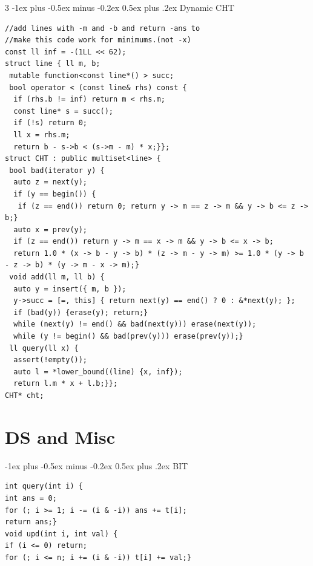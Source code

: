 \documentclass[8pt,a4paper,onesided]{article}
\makeatletter
\renewcommand{\subsection}{\@startsection{subsection}{2}{0mm}
    {-1ex plus -0.5ex minus -0.2ex} %
    {0.5ex plus .2ex}                %
    {\normalfont\large\bfseries}}    %
\makeatother
\begin{document}
\begin{multicols}{3}
\subsection{Dynamic CHT}
\begin{verbatim}
//add lines with -m and -b and return -ans to
//make this code work for minimums.(not -x)
const ll inf = -(1LL << 62);
struct line { ll m, b;
 mutable function<const line*() > succ;
 bool operator < (const line& rhs) const {
  if (rhs.b != inf) return m < rhs.m;
  const line* s = succ();
  if (!s) return 0;
  ll x = rhs.m;
  return b - s->b < (s->m - m) * x;}};
struct CHT : public multiset<line> {
 bool bad(iterator y) {
  auto z = next(y);
  if (y == begin()) {
   if (z == end()) return 0; return y -> m == z -> m && y -> b <= z -> b;}
  auto x = prev(y);
  if (z == end()) return y -> m == x -> m && y -> b <= x -> b;
  return 1.0 * (x -> b - y -> b) * (z -> m - y -> m) >= 1.0 * (y -> b - z -> b) * (y -> m - x -> m);}
 void add(ll m, ll b) {
  auto y = insert({ m, b });
  y->succ = [=, this] { return next(y) == end() ? 0 : &*next(y); };
  if (bad(y)) {erase(y); return;}
  while (next(y) != end() && bad(next(y))) erase(next(y));
  while (y != begin() && bad(prev(y))) erase(prev(y));}
 ll query(ll x) {
  assert(!empty());
  auto l = *lower_bound((line) {x, inf});
  return l.m * x + l.b;}};
CHT* cht;
\end{verbatim}
\section{DS and Misc}
\subsection{BIT}
\begin{verbatim}
int query(int i) {
int ans = 0;
for (; i >= 1; i -= (i & -i)) ans += t[i];
return ans;}
void upd(int i, int val) {
if (i <= 0) return;
for (; i <= n; i += (i & -i)) t[i] += val;}
\end{verbatim}

\end{multicols}
\end{document}
